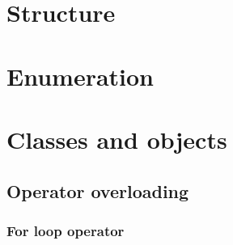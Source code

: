 \section{Structure}%
\label{sec:structs}


\section{Enumeration}%
\label{sec:enum}


\section{Classes and objects}%
\label{sec:classes}

\subsection{Operator overloading}

\subsubsection {For loop operator}
\label{sec:for_loop_override}
